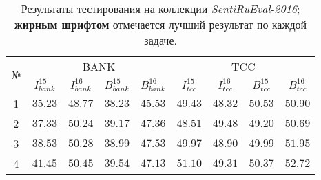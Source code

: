 \begin{table}[ht!]
\centering
\caption{Результаты тестирования на коллекции {\it SentiRuEval-2016};
        {\bf жирным шрифтом} отмечается лучший результат по каждой задаче.
        }
\label{table:results2016}
\begin{tabular}{ccccccccc}
\hline
\multicolumn{1}{c|}{\multirow{2}{*}{№}} & \multicolumn{4}{c|}{BANK}                                                                                                                                 & \multicolumn{4}{c}{TCC}                                                                                                          \\ \cline{2-9}
\multicolumn{1}{c|}{}                   & \multicolumn{1}{c|}{$I_{bank}^{15}$} & \multicolumn{1}{c|}{$I_{bank}^{16}$}   & \multicolumn{1}{c|}{$B_{bank}^{15}$} & \multicolumn{1}{c|}{$B_{bank}^{16}$} & \multicolumn{1}{c|}{$I_{tcc}^{15}$} & \multicolumn{1}{c|}{$I_{tcc}^{16}$} & \multicolumn{1}{c|}{$B_{tcc}^{15}$} & $B_{tcc}^{16}$ \\ \hline
1                                       & $35.23$  \cellcolor[HTML]{C0C0C0}    & ${48.77}$                              & $38.23$  \cellcolor[HTML]{C0C0C0}    & $45.53$                              & $49.43$  \cellcolor[HTML]{C0C0C0}   & $48.32$                             & $50.53$ \cellcolor[HTML]{C0C0C0}    & $50.90$                    \\
2                                       & $37.33$  \cellcolor[HTML]{C0C0C0}    & ${50.24}$                              & $39.17$  \cellcolor[HTML]{C0C0C0}    & $47.36$                              & $48.51$  \cellcolor[HTML]{C0C0C0}   & $49.48$                             & $49.20$ \cellcolor[HTML]{C0C0C0}    & $50.69$                    \\
3                                       & $38.53$  \cellcolor[HTML]{C0C0C0}    & ${50.28}$                              & $38.99$  \cellcolor[HTML]{C0C0C0}    & $47.53$                              & $49.97$  \cellcolor[HTML]{C0C0C0}   & $48.90$                             & $49.99$ \cellcolor[HTML]{C0C0C0}    & $51.95$                    \\
4                                       & $41.45$  \cellcolor[HTML]{C0C0C0}    & ${50.45}$                              & $39.54$  \cellcolor[HTML]{C0C0C0}    & $47.13$                              & $51.10$  \cellcolor[HTML]{C0C0C0}   & $49.31$                             & $50.37$ \cellcolor[HTML]{C0C0C0}    & $52.72$                    \\

\end{tabular}
\end{table}

